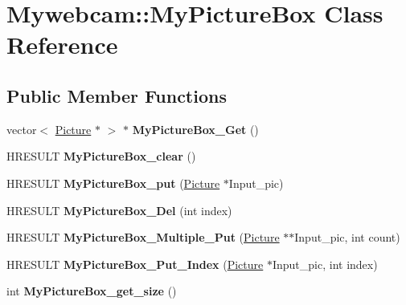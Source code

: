 \hypertarget{class_mywebcam_1_1_my_picture_box}{}\section{Mywebcam\+:\+:My\+Picture\+Box Class Reference}
\label{class_mywebcam_1_1_my_picture_box}
\subsection*{Public Member Functions}
\begin{DoxyCompactItemize}
\item 
\mbox{\label{class_mywebcam_1_1_my_picture_box_a28ffd5f93bdd37ccc84cbdcd922071e0}} 
vector$<$ \hyperlink{class_mywebcam_1_1_picture}{Picture} $\ast$ $>$ $\ast$ {\bfseries My\+Picture\+Box\+\_\+\+Get} ()
\item 
\mbox{\label{class_mywebcam_1_1_my_picture_box_a51a949b3900179285d7ff44abb412fba}} 
H\+R\+E\+S\+U\+LT {\bfseries My\+Picture\+Box\+\_\+clear} ()
\item 
\mbox{\label{class_mywebcam_1_1_my_picture_box_a3f3078ebc256060dc88a5a18997dd0cc}} 
H\+R\+E\+S\+U\+LT {\bfseries My\+Picture\+Box\+\_\+put} (\hyperlink{class_mywebcam_1_1_picture}{Picture} $\ast$Input\+\_\+pic)
\item 
\mbox{\label{class_mywebcam_1_1_my_picture_box_a0cf22bde10525a7e57b7b2ed9ea36afb}} 
H\+R\+E\+S\+U\+LT {\bfseries My\+Picture\+Box\+\_\+\+Del} (int index)
\item 
\mbox{\label{class_mywebcam_1_1_my_picture_box_a2f45956488a7f0566c20903dfef3dbdc}} 
H\+R\+E\+S\+U\+LT {\bfseries My\+Picture\+Box\+\_\+\+Multiple\+\_\+\+Put} (\hyperlink{class_mywebcam_1_1_picture}{Picture} $\ast$$\ast$Input\+\_\+pic, int count)
\item 
\mbox{\label{class_mywebcam_1_1_my_picture_box_a7fbaef7f3fc939d722edb588d07c3712}} 
H\+R\+E\+S\+U\+LT {\bfseries My\+Picture\+Box\+\_\+\+Put\+\_\+\+Index} (\hyperlink{class_mywebcam_1_1_picture}{Picture} $\ast$Input\+\_\+pic, int index)
\item 
\mbox{\label{class_mywebcam_1_1_my_picture_box_ac0b30cb11b1f3120ba2e0054c21e7ac3}} 
int {\bfseries My\+Picture\+Box\+\_\+get\+\_\+size} ()
\end{DoxyCompactItemize}

